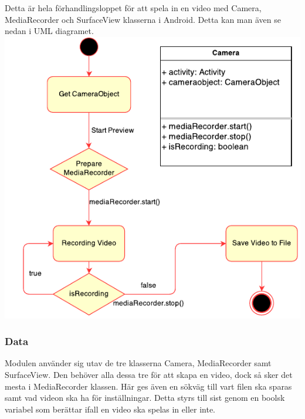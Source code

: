Detta är hela förhandlingsloppet för att spela in en video med Camera, MediaRecorder och SurfaceView klasserna i Android. Detta kan man även se nedan i UML diagramet.
\includegraphics[scale=1.0]{UMLcamera.pdf}

\subsubsection{Data}
Modulen använder sig utav de tre klasserna Camera, MediaRecorder samt SurfaceView. Den behöver alla dessa tre för att skapa en video, dock så sker det mesta i MediaRecorder klassen. Här ges även en sökväg till vart filen ska sparas samt vad videon ska ha för inställningar. Detta styrs till sist genom en boolsk variabel som berättar ifall en video ska spelas in eller inte.

